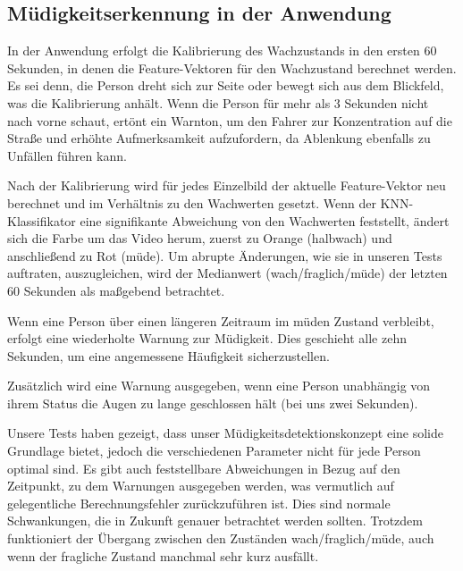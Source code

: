 \subsection{Müdigkeitserkennung in der Anwendung}
\label{subsec:runningdrowsinessdetection}

In der Anwendung erfolgt die Kalibrierung des Wachzustands in den ersten 60 Sekunden, in denen die Feature-Vektoren für den Wachzustand berechnet werden. Es sei denn, die Person dreht sich zur Seite oder bewegt sich aus dem Blickfeld, was die Kalibrierung anhält. Wenn die Person für mehr als 3 Sekunden nicht nach vorne schaut, ertönt ein Warnton, um den Fahrer zur Konzentration auf die Straße und erhöhte Aufmerksamkeit aufzufordern, da Ablenkung ebenfalls zu Unfällen führen kann.

Nach der Kalibrierung wird für jedes Einzelbild der aktuelle Feature-Vektor neu berechnet und im Verhältnis zu den Wachwerten gesetzt. Wenn der KNN-Klassifikator eine signifikante Abweichung von den Wachwerten feststellt, ändert sich die Farbe um das Video herum, zuerst zu Orange (halbwach) und anschließend zu Rot (müde). Um abrupte Änderungen, wie sie in unseren Tests auftraten, auszugleichen, wird der Medianwert (wach/fraglich/müde) der letzten 60 Sekunden als maßgebend betrachtet.

Wenn eine Person über einen längeren Zeitraum im müden Zustand verbleibt, erfolgt eine wiederholte Warnung zur Müdigkeit. Dies geschieht alle zehn Sekunden, um eine angemessene Häufigkeit sicherzustellen.

Zusätzlich wird eine Warnung ausgegeben, wenn eine Person unabhängig von ihrem Status die Augen zu lange geschlossen hält (bei uns zwei Sekunden).

Unsere Tests haben gezeigt, dass unser Müdigkeitsdetektionskonzept eine solide Grundlage bietet, jedoch die verschiedenen Parameter nicht für jede Person optimal sind. Es gibt auch feststellbare Abweichungen in Bezug auf den Zeitpunkt, zu dem Warnungen ausgegeben werden, was vermutlich auf gelegentliche Berechnungsfehler zurückzuführen ist. Dies sind normale Schwankungen, die in Zukunft genauer betrachtet werden sollten. Trotzdem funktioniert der Übergang zwischen den Zuständen wach/fraglich/müde, auch wenn der fragliche Zustand manchmal sehr kurz ausfällt.


